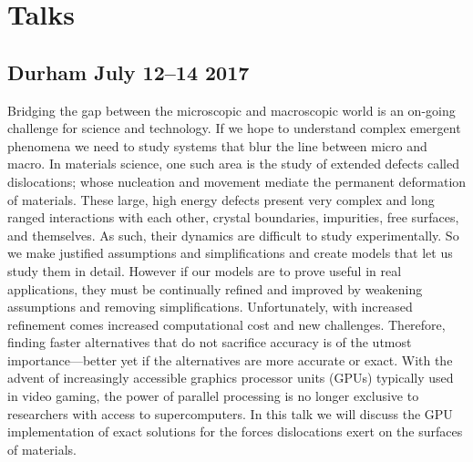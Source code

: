 \chapter{Talks}
\section{Durham July 12--14 2017}
Bridging the gap between the microscopic and macroscopic world is an on-going challenge for science and technology. If we hope to understand complex emergent phenomena we need to study systems that blur the line between micro and macro. In materials science, one such area is the study of extended defects called dislocations; whose nucleation and movement mediate the permanent deformation of materials. These large, high energy defects present very complex and long ranged interactions with each other, crystal boundaries, impurities, free surfaces, and themselves. As such, their dynamics are difficult to study experimentally. So we make justified assumptions and simplifications and create models that let us study them in detail. However if our models are to prove useful in real applications, they must be continually refined and improved by weakening assumptions and removing simplifications. Unfortunately, with increased refinement comes increased computational cost and new challenges. Therefore, finding faster alternatives that do not sacrifice accuracy is of the utmost importance---better yet if the alternatives are more accurate or exact. With the advent of increasingly accessible graphics processor units (GPUs) typically used in video gaming, the power of parallel processing is no longer exclusive to researchers with access to supercomputers. In this talk we will discuss the GPU implementation of exact solutions for the forces dislocations exert on the surfaces of materials.